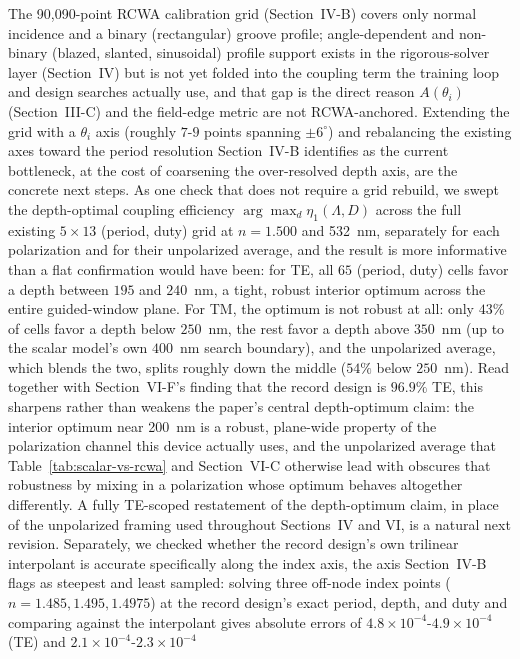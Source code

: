 \documentclass[10pt,twocolumn]{article}
\begin{document}
The 90,090-point RCWA calibration grid (Section~IV-B) covers only normal
incidence and a binary (rectangular) groove profile; angle-dependent and
non-binary (blazed, slanted, sinusoidal) profile support exists in the
rigorous-solver layer (Section~IV) but is not yet folded into the coupling
term the training loop and design searches actually use, and that gap is
the direct reason $A(\theta_i)$ (Section~III-C) and the field-edge metric
are not RCWA-anchored. Extending the grid with a $\theta_i$ axis (roughly
$7$-$9$ points spanning $\pm6^\circ$) and rebalancing the existing axes
toward the period resolution Section~IV-B identifies as the current
bottleneck, at the cost of coarsening the over-resolved depth axis, are
the concrete next steps. As one check that does not require a grid
rebuild, we swept the depth-optimal coupling efficiency $\arg\max_d
\eta_1(\Lambda,D)$ across the full existing $5\times13$ (period, duty)
grid at $n=1.500$ and 532~nm, separately for each polarization and for
their unpolarized average, and the result is more informative than a flat
confirmation would have been: for TE, all $65$ (period, duty) cells favor
a depth between $195$ and $240$~nm, a tight, robust interior optimum
across the entire guided-window plane. For TM, the optimum is not robust
at all: only $43\%$ of cells favor a depth below $250$~nm, the rest favor
a depth above $350$~nm (up to the scalar model's own $400$~nm search
boundary), and the unpolarized average, which blends the two, splits
roughly down the middle ($54\%$ below $250$~nm). Read together with
Section~VI-F's finding that the record design is $96.9\%$ TE, this
sharpens rather than weakens the paper's central depth-optimum claim: the
interior optimum near 200~nm is a robust, plane-wide property of the
polarization channel this device actually uses, and the unpolarized
average that Table~\ref{tab:scalar-vs-rcwa} and Section~VI-C otherwise
lead with obscures that robustness by mixing in a polarization whose
optimum behaves altogether differently. A fully TE-scoped restatement of
the depth-optimum claim, in place of the unpolarized framing used
throughout Sections~IV and VI, is a natural next revision. Separately,
we checked whether the record design's own trilinear interpolant is
accurate specifically along the index axis, the axis Section~IV-B flags
as steepest and least sampled: solving three off-node index points
($n=1.485,1.495,1.4975$) at the record design's exact period, depth, and
duty and comparing against the interpolant gives absolute errors of
$4.8\times10^{-4}$-$4.9\times10^{-4}$ (TE) and $2.1\times10^{-4}$-$2.3\times10^{-4}$
\end{document}
